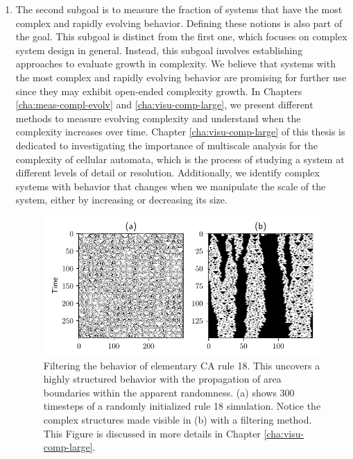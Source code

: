 \begin{enumerate}
  \item The second subgoal is to measure the fraction of systems that have the most complex and rapidly
        evolving behavior. Defining these notions is also part of the goal.
        This subgoal is distinct from the first one, which focuses on complex system design in 
        general. Instead, this subgoal involves establishing approaches to evaluate growth 
        in complexity.
        We believe that systems with the most complex and rapidly
        evolving behavior are promising for further use since
        they may exhibit open-ended complexity growth. In Chapters
        \ref{cha:meas-compl-evolv} and \ref{cha:visu-comp-large}, we present
        different methods to measure evolving complexity and understand when the
        complexity increases over time. Chapter \ref{cha:visu-comp-large} of this thesis is dedicated to investigating the importance of multiscale analysis for the complexity of
        cellular automata, which is the process of studying a system at different levels of detail or resolution.   Additionally, we identify complex systems with behavior that
        changes when we manipulate the scale of the system, either by increasing or decreasing its size.
\begin{figure}[htbp]
  \centering
 \includegraphics[width=.9\linewidth]{figures/rule18_small}
 \caption{Filtering the behavior of elementary \acl{CA} rule 18. This
   uncovers a highly structured behavior with the propagation of area boundaries
   within the apparent randomness. (a) shows 300 timesteps
of a randomly initialized rule 18 simulation. Notice the complex structures made
visible in (b) with a filtering method. This Figure is discussed in more details in Chapter \ref{cha:visu-comp-large}.}
  \label{fig:rule_18}
\end{figure}


\end{enumerate}
